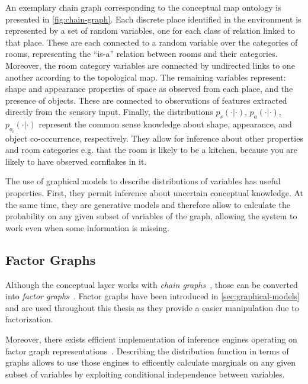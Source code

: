 An exemplary chain graph corresponding to the conceptual map ontology is presented
in \autoref{fig:chain-graph}. 
Each discrete place identified in the environment is represented by a set of random variables, 
one for each class of relation linked to that place. These are each connected to a random variable
over the categories of rooms, representing the ``is-a'' relation between rooms and their categories. 
Moreover, the room category variables are connected by undirected links to one another according 
to the topological map. The remaining variables represent: shape and appearance properties of space 
as observed from each place, and the presence of objects. 
These are connected to observations of features extracted directly from 
the sensory input. Finally, the 
distributions $p_{s}(\cdot|\cdot)$, $p_a(\cdot|\cdot)$, $p_{o_i}(\cdot|\cdot)$ 
represent the common sense knowledge about shape, appearance, and object co-occurrence, respectively. 
They allow for inference about other properties and room categories e.g. that the room is likely to be a kitchen,
because you are likely to have observed cornflakes in it. 

The use of graphical models to describe distributions of variables has useful properties.
First, they permit inference about uncertain conceptual knowledge. At the same time, they are 
generative models and therefore allow to calculate the probability
on any given subset of variables of the graph, allowing the system to work even when some
information is missing.

\subsection{Factor Graphs}
Although the conceptual layer works with \emph{chain graphs}~\cite{lauritzen2002chain},
those can be converted into \emph{factor graphs}~\cite{kschischang2001factor}.
Factor graphs have been introduced in \autoref{sec:graphical-models} and are used
throughout this thesis as they provide a easier manipulation due to factorization.

Moreover, there exists efficient implementation of inference engines operating on factor
graph representations~\cite{Mooij_libDAI_10}.
Describing the distribution function in terms of graphs allows to use those engines to
efficently calculate marginals on any given subset of variables by exploiting conditional
independence between variables.

